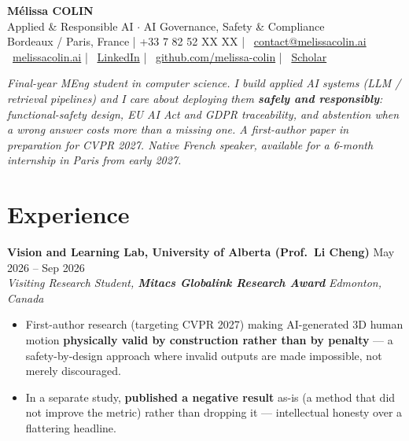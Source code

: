 \documentclass[10pt, letterpaper]{article}
\newcommand{\entry}[4]{%
  \noindent \textbf{#1} \hfill #2 \\
  \textit{#3} \hfill \textit{#4} \par
}
\providecommand{\myphone}{+33 7 82 52 XX XX}
\begin{document}
\begin{center}
    {\fontsize{20}{20}\selectfont \textbf{Mélissa COLIN}} \\[3pt]
    {\large Applied \& Responsible AI $\cdot$ AI Governance, Safety \& Compliance} \\[4pt]

    \small{
    \faMapMarker* Bordeaux / Paris, France \quad|\quad
    \faPhone* \myphone{} \quad|\quad
    \faEnvelope~\href{mailto:contact@melissacolin.ai}{contact@melissacolin.ai} \\
    \faGlobe~\href{https://melissacolin.ai}{melissacolin.ai} \quad|\quad
    \faLinkedin~\href{https://www.linkedin.com/in/melissacolin/}{LinkedIn} \quad|\quad
    \faGithub~\href{https://github.com/melissa-colin}{github.com/melissa-colin} \quad|\quad
    \faGraduationCap~\href{https://scholar.google.com/citations?user=7r7iFpsAAAAJ}{Scholar}
    }
\end{center}

\vspace{2pt}

{\small \textit{Final-year MEng student in computer science. I build applied AI systems
(LLM / retrieval pipelines) and I care about deploying them \textbf{safely and responsibly}:
functional-safety design, EU AI Act and GDPR traceability, and abstention when a wrong
answer costs more than a missing one. A first-author paper in preparation for CVPR 2027. Native French
speaker, available for a 6-month internship in Paris from early 2027.}}

\section{Experience}

\entry{Vision and Learning Lab, University of Alberta (Prof.\ Li Cheng)}{May 2026 -- Sep 2026}%
{Visiting Research Student, \textbf{Mitacs Globalink Research Award}}{Edmonton, Canada}
\begin{itemize}
    \item First-author research (targeting CVPR 2027) making AI-generated 3D human motion \textbf{physically valid by construction rather than by penalty} --- a safety-by-design approach where invalid outputs are made impossible, not merely discouraged.
    \item In a separate study, \textbf{published a negative result} as-is (a method that did not improve the metric) rather than dropping it --- intellectual honesty over a flattering headline.
\end{itemize}
\end{document}
